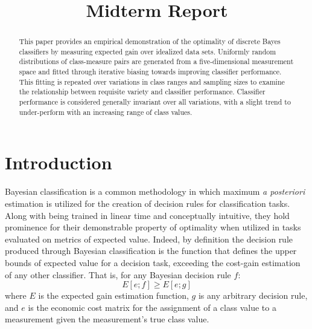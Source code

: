 \documentclass[10pt, conference]{IEEEtran}
\begin{document}
\title{Midterm Report\\
}

\author{
}

\maketitle

\begin{abstract}
This paper provides an empirical demonstration of the optimality of discrete Bayes classifiers by measuring expected gain over idealized data sets. Uniformly random distributions of class-measure pairs are generated from a five-dimensional measurement space and  fitted through iterative biasing towards improving classifier performance. This fitting is repeated over variations in class ranges and sampling sizes to examine the relationship between requisite variety and classifier performance. Classifier performance is considered generally invariant over all variations, with a slight trend to under-perform with an increasing range of class values.   
\end{abstract}

\section{Introduction}
	Bayesian classification is a common methodology in which maximum \textit{a posteriori} estimation is utilized for the creation of decision rules for classification tasks. Along with being trained in linear time \cite{b1} and conceptually intuitive, they hold prominence for their demonstrable property of optimality when utilized in tasks evaluated on metrics of expected value.  Indeed, by definition the decision rule produced through Bayesian classification is the function that defines the upper bounds of expected value for a decision task, exceeding the cost-gain estimation of any other classifier. That is, for any Bayesian decision rule $f$:
\begin{equation}
E[e; f] \geq E[e;g]
\end{equation}
where $E$ is the expected gain estimation function, $g$ is any arbitrary decision rule, and $e$ is the economic cost matrix for the assignment of a class value to a measurement given the measurement's true class value.   
\end{document}
